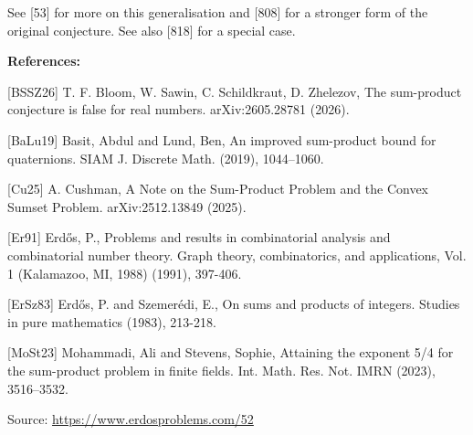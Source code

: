 \documentclass{article}
\begin{document}
See [53] for more on this generalisation and [808] for a stronger form of the original conjecture. See also [818] for a special case.

\bigskip
\noindent\textbf{References:}

[BSSZ26] T. F. Bloom, W. Sawin, C. Schildkraut, D. Zhelezov, The sum-product conjecture is false for real numbers. arXiv:2605.28781 (2026).
 
 [BaLu19] Basit, Abdul and Lund, Ben, An improved sum-product bound for quaternions. SIAM J. Discrete Math. (2019), 1044--1060.
 
 [Cu25] A. Cushman, A Note on the Sum-Product Problem and the Convex Sumset Problem. arXiv:2512.13849 (2025).
 
 [Er91] Erd\H{o}s, P., Problems and results in combinatorial analysis and combinatorial number theory. Graph theory, combinatorics, and applications, Vol. 1 (Kalamazoo, MI, 1988) (1991), 397-406.
 
 [ErSz83] Erd\H{o}s, P. and Szemer\'{e}di, E., On sums and products of integers. Studies in pure mathematics (1983), 213-218.
 
 [MoSt23] Mohammadi, Ali and Stevens, Sophie, Attaining the exponent 5/4 for the sum-product problem in
finite fields. Int. Math. Res. Not. IMRN (2023), 3516--3532.

\bigskip
\noindent\small{Source: \url{https://www.erdosproblems.com/52}}
\end{document}
